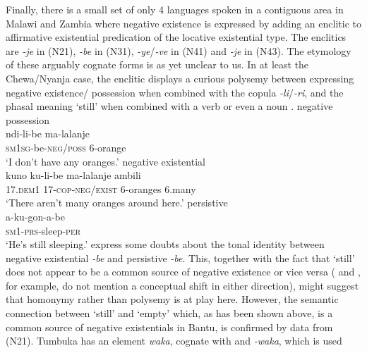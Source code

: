 \documentclass[output=paper]{langscibook}
\begin{document}
Finally, there is a small set of only 4 languages spoken in a contiguous
area in Malawi and Zambia where negative existence is expressed by adding
an enclitic to affirmative existential predication of the locative
existential type. The enclitics are \textit{-je} in  (N21),
\textit{-be} in  (N31),
\textit{-ye}/\textit{-ve} in  (N41) and \textit{-je} in
 (N43). The etymology of these arguably cognate forms is as
yet unclear to us. In at least the Chewa\slash Nyanja case, the enclitic
displays a curious polysemy between expressing negative existence\slash
possession when combined with the copula \textit{-li}/\textit{-ri}, and the
phasal meaning `still' when combined with a verb or even a noun 
%
\parencites[116]{Hetherwick1916}[97, 99]{Watkins1937}[209]{Price1953}
[116, 205, 279]{StevickHollander1965}[20--21]{Paas2004}
[60, 68]{Mchombo2004}[150, 153, 161]{Kiso2012}.  
%
\ea\label{ex:chewa-nyanja-orange-sleep}  \ea negative possession\\
\gll ndi-li-be ma-lalanje\\ \textsc{sm1sg}-be-\textsc{neg/poss} 6-orange\\
\glt 	`I don't have any oranges.' \ex negative existential\\ \gll kuno
ku-li-be ma-lalanje ambili\\ 17.\textsc{dem1} 17-\textsc{cop-neg/exist}
6-oranges 6.many\\ \glt `There aren't many oranges around here.' \ex
persistive\\ \gll a-ku-gon-a-be\\ \textsc{sm1-prs}-sleep-\textsc{per}\\
\glt `He's still sleeping.' \z\z 
%
\citet[279]{StevickHollander1965} express
some doubts about the tonal identity between negative existential
\textit{-be} and persistive \textit{-be}. This, together with the fact that
`still' does not appear to be a common source of negative existence or vice
versa (\citealt{HeineGuldemann1993} and \citealt{HeineKuteva2002}, for
example, do not mention a conceptual shift in either direction), might
suggest that homonymy rather than polysemy is at play here. However, the
semantic connection between `still' and `empty' which, as has been shown
above, is a common source of negative existentials in Bantu, is confirmed
by data from  (N21). Tumbuka has an element \textit{waka},
cognate with  and  \textit{-waka}, which is used
\end{document}
